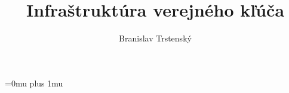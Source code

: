 \documentclass[10pt,slovak,a4paper]{article}
\title{Infraštruktúra verejného kľúča}
\author{Branislav Trstenský\\[2pt]}
\date{}
\begin{document}
\maketitle



\Urlmuskip=0mu plus 1mu
\def\UrlBreaks{\do\/\do-}



\end{document}
